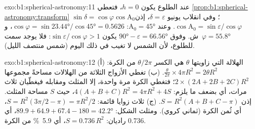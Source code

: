 \begin{solution}{exo:b1:spherical-astronomy:11}
عند الطلوع يكون $h = 0$، فتعطي \cref{prop:b1:spherical-astronomy:transform}
$\sin\delta = \cos\varphi\cos\mathrm{A}_0$؛ وفي انقلاب يونيو
$\delta = \varepsilon$، إذن $\cos\mathrm{A}_0 = \sin\varepsilon/\cos\varphi$.
وعند $\mathrm{A}_0 = \ang{45}$: $\cos\varphi = \sin\ang{23.44}/\cos\ang{45} =
0.5626$، و$\varphi = \ang{55.8}$~ش. وفوق $\ang{90} - \varepsilon =
\ang{66.56}$ يكون $\sin\varepsilon/\cos\varphi > 1$: فلا يوجد سمت للطلوع، لأن الشمس لا تغيب في ذلك اليوم (شمس منتصف الليل).
\end{solution}

\begin{solution}{exo:b1:spherical-astronomy:12}
(أ) الهلالة التي زاويتها $\theta$ هي الكسر $\theta/2\pi$ من الكرة:
$\frac{\theta}{2\pi}\times4\pi R^2 = 2\theta R^2$. (ب) تغطي الأزواج الثلاثة من الهلالات مساحةً مجموعها $2\times(2A + 2B + 2C)R^2$؛ فتغطي الكرة مرة واحدة، إلا المثلث ومقابله فيغطّيان ثلاث مرات، أي بضعف ما يلزم: $4(A + B + C)R^2 = 4\pi R^2 + 4S$، حيث $S$ مساحة المثلث. إذن $S = R^2(A + B + C - \pi)$. (ج) ثلاث زوايا قائمة: $S = R^2(3\pi/2 - \pi) = \pi R^2/2$، أي ثُمن الكرة (ثماني كروي). ومثلث الشكل: $89.9 + 64.9 + 67.4 - 180 = \ang{42.2}$، أي \num{0.736} راديان: $S = 0.736\,R^2$، أي \qty{5.9}{\percent} من الكرة.
\end{solution}


